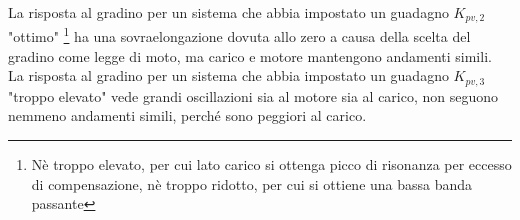 La risposta al gradino per un sistema che abbia impostato un guadagno \(K_{pv,2}\) "ottimo" \footnote{Nè troppo elevato, per cui lato carico si ottenga picco di risonanza per eccesso di compensazione, nè troppo ridotto, per cui si ottiene una bassa banda passante} ha una sovraelongazione dovuta allo zero a causa della scelta del gradino come legge di moto, ma carico e motore mantengono andamenti simili.
La risposta al gradino per un sistema che abbia impostato un guadagno \(K_{pv,3}\) "troppo elevato" vede grandi oscillazioni sia al motore sia al carico, non seguono nemmeno andamenti simili, perché sono peggiori al carico.





